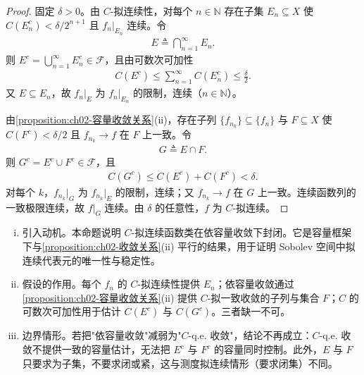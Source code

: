 \documentclass[../../main.tex]{subfiles}%
\begin{document}
\begin{proof}
固定 $\delta>0$。由 $C$-拟连续性，对每个 $n\in\mathbb{N}$ 存在子集 $E_n\subseteq X$ 使 $C(E_n^c)<\delta/2^{n+1}$ 且 $f_n|_{E_n}$ 连续。令
\begin{align*}
E\triangleq\bigcap_{n=1}^\infty E_n.
\end{align*}
则 $E^c=\bigcup_{n=1}^\infty E_n^c\in\mathscr F$，且由可数次可加性
\begin{align*}
C(E^c)\leqslant\sum_{n=1}^\infty C(E_n^c)\leqslant\frac{\delta}{2}.
\end{align*}
又 $E\subseteq E_n$，故 $f_n|_E$ 为 $f_n|_{E_n}$ 的限制，连续（$n\in\mathbb{N}$）。

由\cref{proposition:ch02-容量收敛关系}(ii)，存在子列 $\{f_{n_k}\}\subseteq\{f_n\}$ 与 $F\subseteq X$ 使 $C(F^c)<\delta/2$ 且 $f_{n_k}\to f$ 在 $F$ 上一致。令
\begin{align*}
G\triangleq E\cap F.
\end{align*}
则 $G^c=E^c\cup F^c\in\mathscr F$，且
\begin{align*}
C(G^c)\leqslant C(E^c)+C(F^c)<\delta.
\end{align*}
对每个 $k$，$f_{n_k}|_G$ 为 $f_{n_k}|_{E}$ 的限制，连续；又 $f_{n_k}\to f$ 在 $G$ 上一致。连续函数列的一致极限连续，故 $f|_G$ 连续。由 $\delta$ 的任意性，$f$ 为 $C$-拟连续。
\end{proof}

\begin{remark}\label{remark:ch02-容量拟连续闭}
\begin{enumerate}[(i)]
\item 引入动机。本命题说明 $C$-拟连续函数类在依容量收敛下封闭。它是容量框架下与\cref{proposition:ch02-收敛关系}(ii) 平行的结果，用于证明 Sobolev 空间中拟连续代表元的唯一性与稳定性。
\item 假设的作用。每个 $f_n$ 的 $C$-拟连续性提供 $E_n$；依容量收敛通过\cref{proposition:ch02-容量收敛关系}(ii) 提供 $C$-拟一致收敛的子列与集合 $F$；$C$ 的可数次可加性用于估计 $C(E^c)$ 与 $C(G^c)$。三者缺一不可。
\item 边界情形。若把"依容量收敛"减弱为"$C$-q.e. 收敛"，结论不再成立：$C$-q.e. 收敛不提供一致的容量估计，无法把 $E^c$ 与 $F^c$ 的容量同时控制。此外，$E$ 与 $F$ 只要求为子集，不要求闭或紧，这与测度拟连续情形（要求闭集）不同。
\end{enumerate}
\end{remark}
\end{document}
